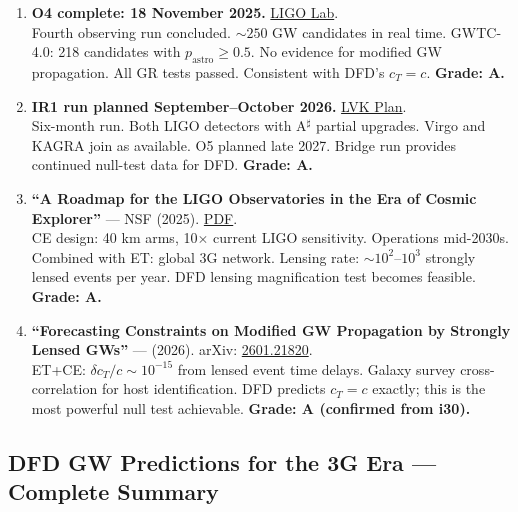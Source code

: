 \documentclass[11pt,a4paper]{article}
\begin{document}
\begin{enumerate}
\item \textbf{O4 complete: 18 November 2025.} \href{https://www.ligo.caltech.edu/news/ligo20251118}{LIGO Lab}.\\
Fourth observing run concluded. $\sim 250$ GW candidates in real time. GWTC-4.0: 218 candidates with $p_\mathrm{astro} \geq 0.5$. No evidence for modified GW propagation. All GR tests passed. Consistent with DFD's $c_T = c$. \textbf{Grade: A.}

\item \textbf{IR1 run planned September--October 2026.} \href{https://observing.docs.ligo.org/plan/}{LVK Plan}.\\
Six-month run. Both LIGO detectors with A$^\sharp$ partial upgrades. Virgo and KAGRA join as available. O5 planned late 2027. Bridge run provides continued null-test data for DFD. \textbf{Grade: A.}

\item \textbf{``A Roadmap for the LIGO Observatories in the Era of Cosmic Explorer''} --- NSF (2025). \href{https://nsf-gov-resources.nsf.gov/files/ligo-observatories-white-paper-submission.pdf}{PDF}.\\
CE design: 40 km arms, 10$\times$ current LIGO sensitivity. Operations mid-2030s. Combined with ET: global 3G network. Lensing rate: $\sim 10^2$--$10^3$ strongly lensed events per year. DFD lensing magnification test becomes feasible. \textbf{Grade: A.}

\item \textbf{``Forecasting Constraints on Modified GW Propagation by Strongly Lensed GWs''} --- (2026). arXiv: \href{https://arxiv.org/abs/2601.21820}{2601.21820}.\\
ET+CE: $\delta c_T/c \sim 10^{-15}$ from lensed event time delays. Galaxy survey cross-correlation for host identification. DFD predicts $c_T = c$ exactly; this is the most powerful null test achievable. \textbf{Grade: A (confirmed from i30).}
\end{enumerate}

\subsection{DFD GW Predictions for the 3G Era --- Complete Summary}
\end{document}
